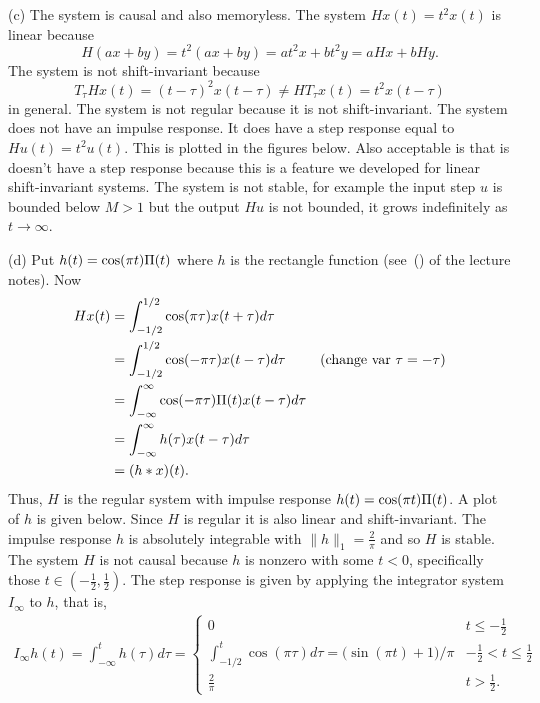\begin{excersizelist}
\begin{solution}
(c) The system is causal and also memoryless.  The system $Hx(t) = t^2x(t)$ is linear because 
\[
H(ax+by) = t^2(ax+by) = at^2x + bt^2y = aH x + bHy.
\]
The system is not shift-invariant because
\[
T_\tau H x(t) = (t-\tau)^2x(t-\tau) \neq H T_\tau x(t) = t^2 x(t - \tau)
\]
in general.  The system is not regular because it is not shift-invariant.  The system does not have an impulse response.  It does have a step response equal to $Hu(t) = t^2u(t)$.  This is plotted in the figures below.  Also acceptable is that is doesn't have a step response because this is a feature we developed for linear shift-invariant systems.  The system is not stable, for example the input step $u$ is bounded below $M > 1$ but the output $Hu$ is not bounded, it grows indefinitely as $t \to \infty$.

(d) Put $h(t) = \cos(\pi t) \Pi(t)$ where $h$ is the rectangle function (see~() of the lecture notes).  Now
\begin{align*}
Hx(t) &= \int_{-1/2}^{1/2} \cos(\pi\tau) x(t + \tau) d\tau \\
&=\int_{-1/2}^{1/2} \cos(-\pi\tau) x(t - \tau) d\tau & \text{(change var $\tau=-\tau$)}\\
&=\int_{-\infty}^{\infty} \cos(-\pi\tau)\Pi(t) x(t - \tau) d\tau \\
&=\int_{-\infty}^{\infty} h(\tau) x(t - \tau) d\tau \\
&= (h*x)(t).
\end{align*}
Thus, $H$ is the regular system with impulse response $h(t) = \cos(\pi t) \Pi(t)$.  A plot of $h$ is given below.  Since $H$ is regular it is also linear and shift-invariant.  The impulse response $h$ is absolutely  integrable with $\|h\|_1 = \tfrac{2}{\pi}$ and so $H$ is stable.  The system $H$ is not causal because $h$ is nonzero with some $t < 0$, specifically those $t \in (-\tfrac{1}{2},\tfrac{1}{2})$.  The step response is given by applying the integrator system $I_\infty$ to $h$, that is, 
\begin{align*}
I_\infty h(t) = \int_{-\infty}^t h(\tau) d\tau = \begin{cases}
0 & t \leq -\tfrac{1}{2} \\
\int_{-1/2}^t \cos(\pi\tau) d\tau = \big(\sin(\pi t) + 1\big)/\pi & -\tfrac{1}{2} < t \leq \tfrac{1}{2} \\
\tfrac{2}{\pi} & t > \tfrac{1}{2}.
\end{cases}
\end{align*}


\end{solution}
\end{excersizelist}
